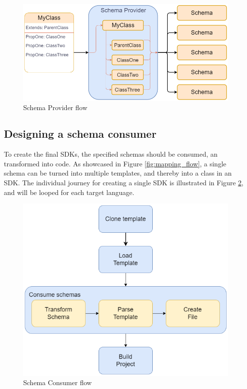 \begin{figure}[h!]
    \centering
    \includegraphics[width=\textwidth]{figures/assets/schema_provider_flow.png}
    \caption{Schema Provider flow}
    \label{fig:schema_provider_flow}
\end{figure}


\subsection{Designing a schema consumer \label{sec:design:schema_consumer}}
To create the final SDKs, the specified schemas should be consumed, an transformed into code.
As showcased in Figure \ref{fig:mapping_flow}, a single schema can be turned into multiple templates, and thereby into a class in an SDK.
The individual journey for creating a single SDK is illustrated in Figure \ref{fig:schema_consumer_flow}, and will be looped for each target language.

\begin{figure}[h!]
    \centering
    \includegraphics[width=12cm]{figures/assets/schema_consumer_flow.png}
    \caption{Schema Consumer flow}
    \label{fig:schema_consumer_flow}
\end{figure}

